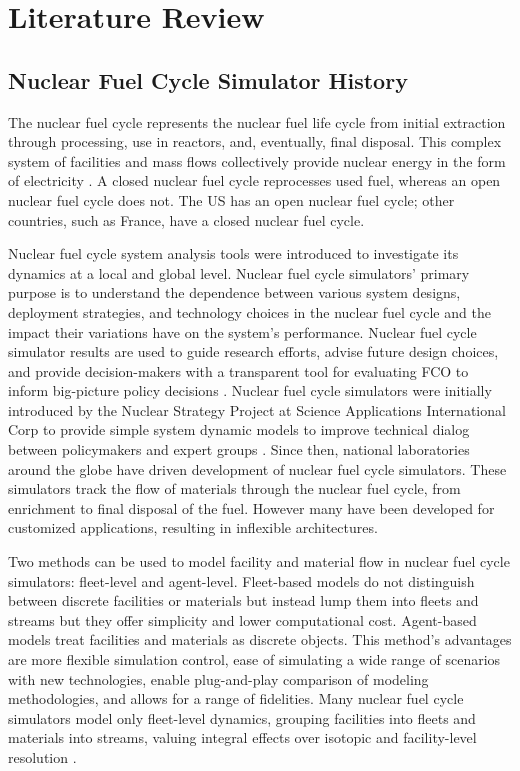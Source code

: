 \chapter{Literature Review}

\section{Nuclear Fuel Cycle Simulator History}
The nuclear fuel cycle represents the nuclear fuel life cycle from initial
extraction through processing, use in reactors, and, eventually, 
final disposal.
This complex system of facilities and mass flows 
collectively provide nuclear energy 
in the form of electricity \cite{yacout_modeling_2005}.
A closed nuclear fuel cycle reprocesses used fuel, whereas an open 
nuclear fuel cycle does not.  
The US has an open nuclear fuel cycle; other countries, such as France, 
have a closed nuclear fuel cycle. 

Nuclear fuel cycle system analysis tools were introduced to investigate 
its dynamics at a local and global level. 
Nuclear fuel cycle simulators' primary purpose   
is to understand the dependence between various system designs, deployment 
strategies, and technology choices
in the nuclear fuel cycle and the impact their variations have on 
the system's performance. 
Nuclear fuel cycle simulator results are used to guide research 
efforts, advise future design choices, and provide 
decision-makers with a transparent tool for evaluating \gls{FCO} 
to inform big-picture policy decisions \cite{yacout_modeling_2005}.
Nuclear fuel cycle simulators were initially introduced 
by the Nuclear Strategy Project at Science Applications International Corp 
to provide simple system dynamic models to improve technical dialog between 
policymakers and expert groups \cite{yacout_modeling_2005}.
Since then, national laboratories around the globe have driven 
development of nuclear fuel cycle simulators. 
These simulators track the flow of materials through the nuclear fuel cycle, 
from enrichment to final disposal of the fuel. 
However many have been developed for customized applications, resulting in 
inflexible architectures.  

Two methods can be used to model facility and material flow in 
nuclear fuel cycle simulators: fleet-level and agent-level.  
Fleet-based models do not distinguish between discrete facilities 
or materials but instead lump them into fleets and streams but they 
offer simplicity and lower computational cost. 
Agent-based models treat facilities and materials as discrete 
objects. 
This method's advantages are more flexible simulation control,
ease of simulating a wide range of scenarios with new 
technologies, enable plug-and-play comparison of modeling 
methodologies, and allows for a range of fidelities.  
Many nuclear fuel cycle simulators model only fleet-level dynamics,
grouping facilities into fleets and materials into streams, valuing integral 
effects over isotopic and facility-level resolution \cite{huff_fundamental_2016}.

